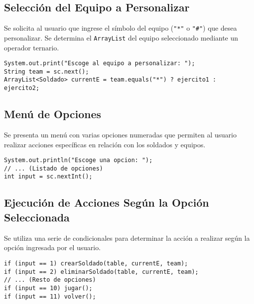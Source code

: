 \subsection{Selección del Equipo a Personalizar}
Se solicita al usuario que ingrese el símbolo del equipo (\texttt{"*"} o \texttt{"\#"}) que desea personalizar. Se determina el \texttt{ArrayList} del equipo seleccionado mediante un operador ternario.
\begin{lstlisting}
System.out.print("Escoge al equipo a personalizar: ");
String team = sc.next();
ArrayList<Soldado> currentE = team.equals("*") ? ejercito1 : ejercito2;
\end{lstlisting}

\subsection{Menú de Opciones}
Se presenta un menú con varias opciones numeradas que permiten al usuario realizar acciones específicas en relación con los soldados y equipos.
\begin{lstlisting}
System.out.println("Escoge una opcion: ");
// ... (Listado de opciones)
int input = sc.nextInt();
\end{lstlisting}

\subsection{Ejecución de Acciones Según la Opción Seleccionada}
Se utiliza una serie de condicionales para determinar la acción a realizar según la opción ingresada por el usuario.
\begin{lstlisting}
if (input == 1) crearSoldado(table, currentE, team);
if (input == 2) eliminarSoldado(table, currentE, team);
// ... (Resto de opciones)
if (input == 10) jugar();
if (input == 11) volver();
\end{lstlisting}

